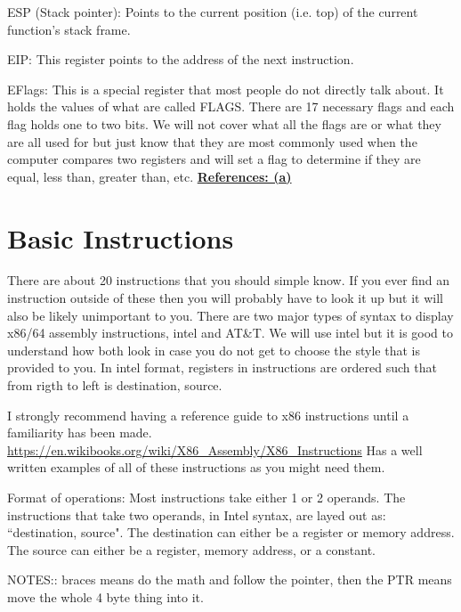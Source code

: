 \documentclass{report}
\begin{document}
ESP (Stack pointer): Points to the current position (i.e. top) of the current function’s stack frame.\newline

EIP: This register points to the address of the next instruction.\newline

EFlags: This is a special register that most people do not directly talk about.  It holds the values of what are called FLAGS.  There are 17 necessary flags and each flag holds one to two bits.  We will not cover what all the flags are or what they are all used for but just know that they are most commonly used when the computer compares two registers and will set a flag to determine if they are equal, less than, greater than, etc.  \hyperref[ref:2]{\textbf{References: (a)}}   

\section{Basic Instructions}
There are about 20 instructions that you should simple know.  If you ever find an instruction outside of these then you will probably have to look it up but it will also be likely unimportant to you.  There are two major types of syntax to display x86/64 assembly instructions, intel and AT\&T.  We will use intel but it is good to understand how both look in case you do not get to choose the style that is provided to you.  In intel format, registers in instructions are ordered such that from rigth to left is destination, source.\newline

I strongly recommend having a reference guide to x86 instructions until a familiarity has been made.  \url{https://en.wikibooks.org/wiki/X86_Assembly/X86_Instructions} Has a well written examples of all of these instructions as you might need them.\newline


Format of operations: \newline
Most instructions take either 1 or 2 operands.  The instructions that take two operands, in Intel syntax, are layed out as: ``destination, source". The destination can either be a register or memory address.  The source can either be a register, memory address, or a constant.\newline


NOTES::
braces means do the math and follow the pointer, then the PTR means move the whole 4 byte thing into it.\newline
\end{document}
